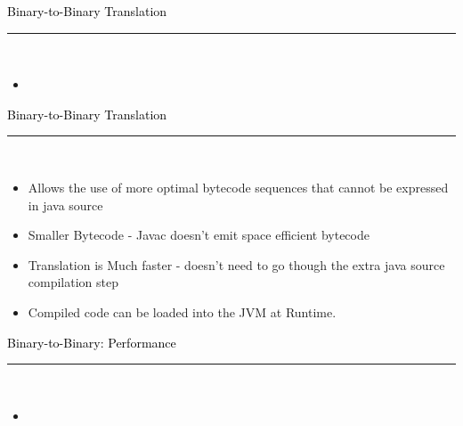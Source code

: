 \documentclass[letter]{seminar}
\begin{document}
\begin{slide}\raggedright
\renewcommand{\leftmargini}{5mm}
{\Large{\textcolor{black}{Binary-to-Binary Translation}}}
\\\rule{\textwidth}{0.1pt}\\

\begin{itemize}

\item \begin{figure}[H]
\begin{center}
\end{center}
\end{figure}

\end{itemize}


\end{slide}


\begin{slide}\raggedright
\renewcommand{\leftmargini}{5mm}
{\Large{\textcolor{black}{Binary-to-Binary Translation}}}
\\\rule{\textwidth}{0.1pt}\\

\begin{itemize}


\item
         Allows the use of more optimal bytecode sequences that cannot be expressed 
          in java source

\item
         Smaller Bytecode - Javac doesn't emit space efficient bytecode

\item
         Translation is Much faster - doesn't need to go though the extra java
          source compilation step

\item
         Compiled code can be loaded into the JVM at Runtime.


\end{itemize}


\end{slide}


\begin{slide}\raggedright
\renewcommand{\leftmargini}{5mm}
{\Large{\textcolor{black}{Binary-to-Binary: Performance}}}
\\\rule{\textwidth}{0.1pt}\\

\begin{itemize}

\item \begin{figure}[H]
\begin{center}
\end{center}
\end{figure}

\end{itemize}


\end{slide}
\end{document}
